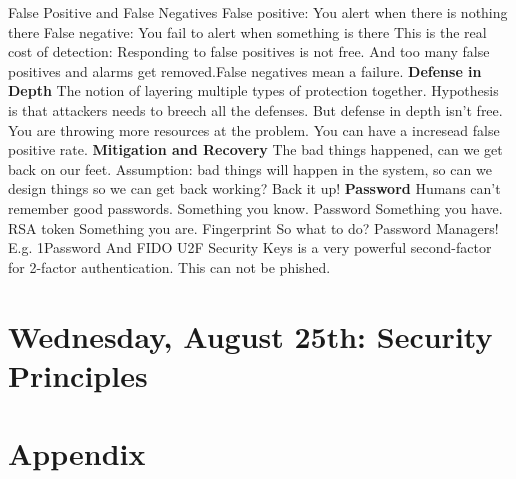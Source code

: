 \documentclass[11 pt]{scrartcl}
\begin{document}
False Positive and False Negatives\newline
False positive: You alert when there is nothing there \newline
False negative: You fail to alert when something is there \newline
This is the real cost of detection:\newline
Responding to false positives is not free. And too many false positives and alarms get removed.False negatives mean a failure.\newline
\textbf{Defense in Depth}\newline
The notion of layering multiple types of protection together. Hypothesis is that attackers needs to breech all the defenses. But defense in depth isn't free. You are throwing more resources at the problem. You can have a incresead false positive rate.\newline
\textbf{Mitigation and Recovery}
The bad things happened, can we get back on our feet. Assumption: bad things will happen in the system, so can we design things so we can get back working? Back it up!\newline
\textbf{Password}\newline
Humans can't remember good passwords.\newline
Something you know. Password\newline
Something you have. RSA token\newline
Something you are. Fingerprint\newline
So what to do? Password Managers! E.g. 1Password\newline
And FIDO U2F Security Keys is a very powerful second-factor for 2-factor authentication. This can not be phished.
\newpage
\section{Wednesday, August 25th: Security Principles}



\section{Appendix}
\renewcommand{\listtheoremname}{List of Definitions and Theorems}
\listoftheorems[ignoreall,show={theorem,definition}]

\listoftodos
\end{document}
